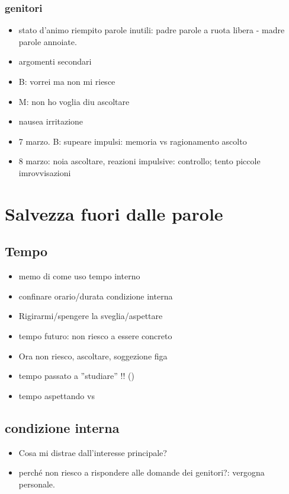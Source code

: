 \subsection{genitori}

\begin{itemize}
\item stato d'animo riempito parole inutili: padre parole a ruota libera - madre parole annoiate.
\item argomenti secondari
\item B: vorrei ma non mi riesce
\item M: non ho voglia diu ascoltare
\item nausea irritazione
\item 7 marzo. B: supeare impulsi: memoria vs ragionamento ascolto
\item 8 marzo: noia ascoltare, reazioni impulsive: controllo; tento piccole imrovvisazioni
\end{itemize}

{\let\clearpage\relax
\chapter{Salvezza fuori dalle parole}
}

\section{Tempo}

\begin{itemize}
\item memo di come uso tempo interno
\item confinare orario/durata condizione interna
\item Rigirarmi/spengere la sveglia/aspettare
\item tempo futuro: non riesco a essere concreto
\item Ora non riesco, ascoltare, soggezione figa
\item tempo passato a ''studiare'' !! ()
\item tempo aspettando vs 
\end{itemize}

\section{condizione interna}

\begin{itemize}
\item Cosa mi distrae dall'interesse principale?
\item perch\'e non riesco a rispondere alle domande dei genitori?: vergogna personale.
\end{itemize}

